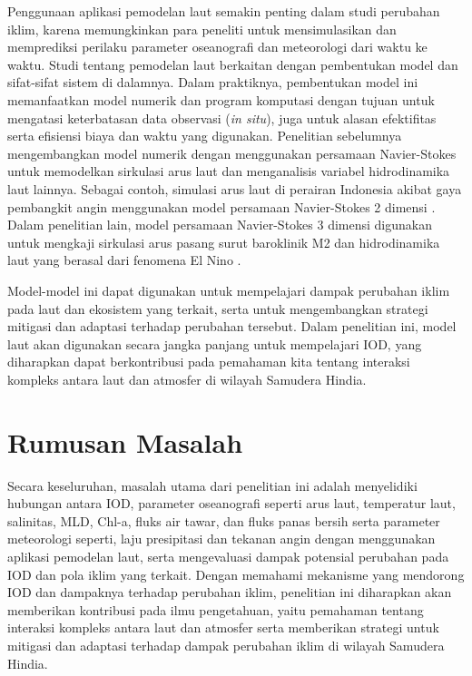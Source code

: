 \begin{spacing}{1.5}
	Penggunaan aplikasi pemodelan laut semakin penting dalam studi perubahan iklim, karena memungkinkan para peneliti untuk mensimulasikan dan memprediksi perilaku parameter oseanografi dan meteorologi dari waktu ke waktu. Studi tentang pemodelan laut berkaitan dengan pembentukan model dan sifat-sifat sistem di dalamnya. Dalam praktiknya, pembentukan model ini memanfaatkan model numerik dan program komputasi dengan tujuan untuk mengatasi keterbatasan data observasi (\textit{in situ}), juga untuk alasan efektifitas serta efisiensi biaya dan waktu yang digunakan. Penelitian sebelumnya mengembangkan model numerik dengan menggunakan persamaan Navier-Stokes untuk memodelkan sirkulasi arus laut dan menganalisis variabel hidrodinamika laut lainnya. Sebagai contoh, simulasi arus laut di perairan Indonesia akibat gaya pembangkit angin menggunakan model persamaan Navier-Stokes 2 dimensi \cite{Rizal2018,Ikhwan2019,Haditiar2019}. Dalam penelitian lain, model persamaan Navier-Stokes 3 dimensi digunakan untuk mengkaji sirkulasi arus pasang surut baroklinik M2 dan hidrodinamika laut yang berasal dari fenomena El Nino \cite{Rizal2010,Haditiar2020,Ikhwan2021}.
	
	Model-model ini dapat digunakan untuk mempelajari dampak perubahan iklim pada laut dan ekosistem yang terkait, serta untuk mengembangkan strategi mitigasi dan adaptasi terhadap perubahan tersebut. Dalam penelitian ini, model laut akan digunakan secara jangka panjang untuk mempelajari IOD, yang diharapkan dapat berkontribusi pada pemahaman kita tentang interaksi kompleks antara laut dan atmosfer di wilayah Samudera Hindia. 
	
	\section[Rumusan Masalah]{Rumusan Masalah}
	Secara keseluruhan, masalah utama dari penelitian ini adalah menyelidiki hubungan antara IOD, parameter oseanografi seperti arus laut, temperatur laut, salinitas, MLD, Chl-a, fluks air tawar, dan fluks panas bersih serta parameter meteorologi seperti, laju presipitasi dan tekanan angin dengan menggunakan aplikasi pemodelan laut, serta mengevaluasi dampak potensial perubahan pada IOD dan pola iklim yang terkait. Dengan memahami mekanisme yang mendorong IOD dan dampaknya terhadap perubahan iklim, penelitian ini diharapkan akan memberikan kontribusi pada ilmu pengetahuan, yaitu pemahaman tentang interaksi kompleks antara laut dan atmosfer serta memberikan strategi untuk mitigasi dan adaptasi terhadap dampak perubahan iklim di wilayah Samudera Hindia.


\end{spacing}
